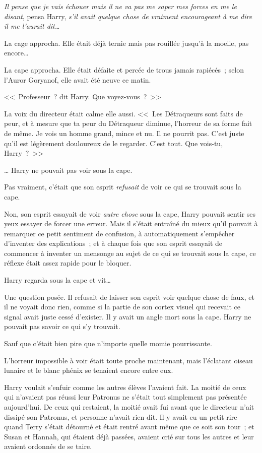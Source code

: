 \emph{Il pense que je vais échouer mais il ne va pas me saper mes forces en me le disant}, pensa Harry, \emph{s'il avait quelque chose de vraiment encourageant à me dire il me l'aurait dit…}

La cage approcha. Elle était déjà ternie mais pas rouillée jusqu'à la moelle, pas encore…

La cape approcha. Elle était défaite et percée de trous jamais rapiécés~; selon l'Auror Goryanof, elle avait été neuve ce matin.

<<~Professeur~? dit Harry. Que voyez-vous~?~>>

La voix du directeur était calme elle aussi. <<~Les Détraqueurs sont faits de peur, et à mesure que ta peur du Détraqueur diminue, l'horreur de sa forme fait de même. Je vois un homme grand, mince et nu. Il ne pourrit pas. C'est juste qu'il est légèrement douloureux de le regarder. C'est tout. Que vois-tu, Harry~?~>>

… Harry ne pouvait pas voir sous la cape.

Pas vraiment, c'était que son esprit \emph{refusait} de voir ce qui se trouvait sous la cape.

Non, son esprit essayait de voir \emph{autre chose} sous la cape, Harry pouvait sentir ses yeux essayer de forcer une erreur. Mais il s'était entraîné du mieux qu'il pouvait à remarquer ce petit sentiment de confusion, à automatiquement s'empêcher d'inventer des explications~; et à chaque fois que son esprit essayait de commencer à inventer un mensonge au sujet de ce qui se trouvait sous la cape, ce réflexe était assez rapide pour le bloquer.

Harry regarda sous la cape et vit…

Une question posée. Il refusait de laisser son esprit voir quelque chose de faux, et il ne voyait donc rien, comme si la partie de son cortex visuel qui recevait ce signal avait juste cessé d'exister. Il y avait un angle mort sous la cape. Harry ne pouvait pas savoir ce qui s'y trouvait.

Sauf que c'était bien pire que n'importe quelle momie pourrissante.

L'horreur impossible à voir était toute proche maintenant, mais l'éclatant oiseau lunaire et le blanc phénix se tenaient encore entre eux.

Harry voulait s'enfuir comme les autres élèves l'avaient fait. La moitié de ceux qui n'avaient pas réussi leur Patronus ne s'était tout simplement pas présentée aujourd'hui. De ceux qui restaient, la moitié avait fui avant que le directeur n'ait dissipé son Patronus, et personne n'avait rien dit. Il y avait eu un petit rire quand Terry s'était détourné et était rentré avant même que ce soit son tour~; et Susan et Hannah, qui étaient déjà passées, avaient crié sur tous les autres et leur avaient ordonnés de se taire.

